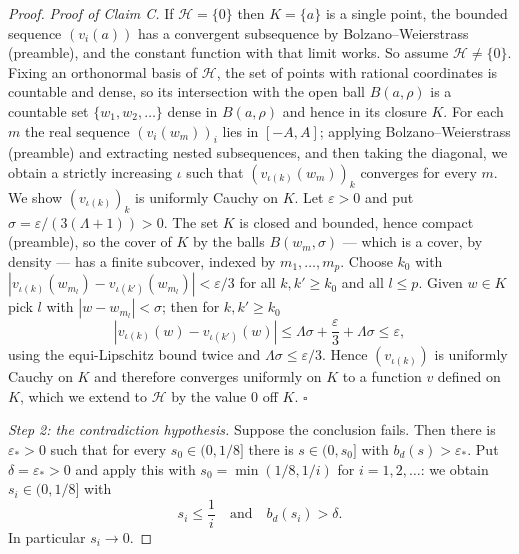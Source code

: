 \begin{proof}
\emph{Proof of Claim C.} If $\mathcal H=\{0\}$ then $K=\{a\}$ is a single point,
the bounded sequence $(v_i(a))$ has a convergent subsequence by
Bolzano--Weierstrass (preamble), and the constant function with that limit
works. So assume $\mathcal H\ne\{0\}$. Fixing an orthonormal basis of
$\mathcal H$, the set of points with rational coordinates is countable and
dense, so its intersection with the open ball $B(a,\rho)$ is a countable set
$\{w_1,w_2,\dots\}$ dense in $B(a,\rho)$ and hence in its closure $K$. For each
$m$ the real sequence $(v_i(w_m))_i$ lies in $[-A,A]$; applying
Bolzano--Weierstrass (preamble) and extracting nested subsequences, and then
taking the diagonal, we obtain a strictly increasing $\iota$ such that
$(v_{\iota(k)}(w_m))_k$ converges for every $m$. We show
$(v_{\iota(k)})_k$ is uniformly Cauchy on $K$. Let $\varepsilon>0$ and put
$\sigma=\varepsilon/(3(\Lambda+1))>0$. The set $K$ is closed and bounded, hence
compact (preamble), so the cover of $K$ by the balls $B(w_m,\sigma)$ --- which
is a cover, by density --- has a finite subcover, indexed by
$m_1,\dots,m_p$. Choose $k_0$ with
$|v_{\iota(k)}(w_{m_l})-v_{\iota(k')}(w_{m_l})|<\varepsilon/3$ for all
$k,k'\ge k_0$ and all $l\le p$. Given $w\in K$ pick $l$ with
$|w-w_{m_l}|<\sigma$; then for $k,k'\ge k_0$
\[
  |v_{\iota(k)}(w)-v_{\iota(k')}(w)|
   \le\Lambda\sigma+\frac\varepsilon3+\Lambda\sigma\le\varepsilon,
\]
using the equi-Lipschitz bound twice and $\Lambda\sigma\le\varepsilon/3$. Hence
$(v_{\iota(k)})$ is uniformly Cauchy on $K$ and therefore converges uniformly on
$K$ to a function $v$ defined on $K$, which we extend to $\mathcal H$ by the
value $0$ off $K$. \hfill$\square$

\emph{Step 2: the contradiction hypothesis.}
Suppose the conclusion fails. Then there is $\varepsilon_*>0$ such that for
every $s_0\in(0,1/8]$ there is $s\in(0,s_0]$ with $b_d(s)>\varepsilon_*$. Put
$\delta=\varepsilon_*>0$ and apply this with $s_0=\min(1/8,1/i)$ for
$i=1,2,\dots$: we obtain $s_i\in(0,1/8]$ with
\begin{equation}\label{eq:ff-badb}
  s_i\le\frac1i\quad\text{and}\quad b_d(s_i)>\delta .
\end{equation}
In particular $s_i\to0$.


\end{proof}
